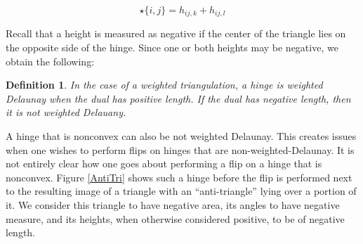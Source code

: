 \documentclass[12pt]{article}
\newtheorem{definition}[theorem]{Definition}
\begin{document}
$$\star\{i,j\} = h_{ij,k} + h_{ij,l}$$

 Recall that a height is measured as negative if the center of the triangle lies on the opposite side of the hinge. Since one or both heights may be negative, we obtain the following:
\begin{definition}
In the case of a weighted triangulation, a hinge is weighted Delaunay when the dual has positive length. If the dual has negative length, then it is not weighted Delauany. 
\end{definition}

 A hinge that is nonconvex can also be not weighted Delaunay. This creates issues when one wishes to perform flips on hinges that are non-weighted-Delaunay. It is not entirely clear how one goes about performing a flip on a hinge that is nonconvex. Figure \ref{AntiTri} shows such a hinge before the flip is performed next to the resulting image of a triangle with an ``anti-triangle'' lying over a portion of it. We consider this triangle to have negative area, its angles to have negative measure, and its heights, when otherwise considered positive, to be of negative length.
\end{document}
